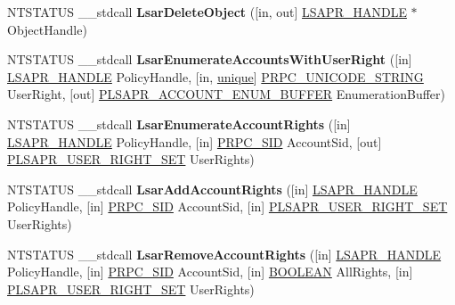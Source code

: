 \begin{DoxyCompactItemize}
\item 
\mbox{\label{interfacelsarpc_acb3a537af5e4ac85fac0cc5b1d6f45f1}} 
N\+T\+S\+T\+A\+T\+US \+\_\+\+\_\+stdcall {\bfseries Lsar\+Delete\+Object} (\mbox{[}in, out\mbox{]} \hyperlink{interfacevoid}{L\+S\+A\+P\+R\+\_\+\+H\+A\+N\+D\+LE} $\ast$Object\+Handle)
\item 
\mbox{\label{interfacelsarpc_a6236f080b841493ce6437fb4e32bf24b}} 
N\+T\+S\+T\+A\+T\+US \+\_\+\+\_\+stdcall {\bfseries Lsar\+Enumerate\+Accounts\+With\+User\+Right} (\mbox{[}in\mbox{]} \hyperlink{interfacevoid}{L\+S\+A\+P\+R\+\_\+\+H\+A\+N\+D\+LE} Policy\+Handle, \mbox{[}in, \hyperlink{interfaceunique}{unique}\mbox{]} \hyperlink{struct___r_p_c___u_n_i_c_o_d_e___s_t_r_i_n_g}{P\+R\+P\+C\+\_\+\+U\+N\+I\+C\+O\+D\+E\+\_\+\+S\+T\+R\+I\+NG} User\+Right, \mbox{[}out\mbox{]} \hyperlink{struct___l_s_a_p_r___a_c_c_o_u_n_t___e_n_u_m___b_u_f_f_e_r}{P\+L\+S\+A\+P\+R\+\_\+\+A\+C\+C\+O\+U\+N\+T\+\_\+\+E\+N\+U\+M\+\_\+\+B\+U\+F\+F\+ER} Enumeration\+Buffer)
\item 
\mbox{\label{interfacelsarpc_a3a4999700367dcc76fba365a9e5048f6}} 
N\+T\+S\+T\+A\+T\+US \+\_\+\+\_\+stdcall {\bfseries Lsar\+Enumerate\+Account\+Rights} (\mbox{[}in\mbox{]} \hyperlink{interfacevoid}{L\+S\+A\+P\+R\+\_\+\+H\+A\+N\+D\+LE} Policy\+Handle, \mbox{[}in\mbox{]} \hyperlink{struct___r_p_c___s_i_d}{P\+R\+P\+C\+\_\+\+S\+ID} Account\+Sid, \mbox{[}out\mbox{]} \hyperlink{struct___l_s_a_p_r___u_s_e_r___r_i_g_h_t___s_e_t}{P\+L\+S\+A\+P\+R\+\_\+\+U\+S\+E\+R\+\_\+\+R\+I\+G\+H\+T\+\_\+\+S\+ET} User\+Rights)
\item 
\mbox{\label{interfacelsarpc_ad2e256990e86a8070520f54efa965425}} 
N\+T\+S\+T\+A\+T\+US \+\_\+\+\_\+stdcall {\bfseries Lsar\+Add\+Account\+Rights} (\mbox{[}in\mbox{]} \hyperlink{interfacevoid}{L\+S\+A\+P\+R\+\_\+\+H\+A\+N\+D\+LE} Policy\+Handle, \mbox{[}in\mbox{]} \hyperlink{struct___r_p_c___s_i_d}{P\+R\+P\+C\+\_\+\+S\+ID} Account\+Sid, \mbox{[}in\mbox{]} \hyperlink{struct___l_s_a_p_r___u_s_e_r___r_i_g_h_t___s_e_t}{P\+L\+S\+A\+P\+R\+\_\+\+U\+S\+E\+R\+\_\+\+R\+I\+G\+H\+T\+\_\+\+S\+ET} User\+Rights)
\item 
\mbox{\label{interfacelsarpc_a65c6619f9e6d723fa1c635354e21e50d}} 
N\+T\+S\+T\+A\+T\+US \+\_\+\+\_\+stdcall {\bfseries Lsar\+Remove\+Account\+Rights} (\mbox{[}in\mbox{]} \hyperlink{interfacevoid}{L\+S\+A\+P\+R\+\_\+\+H\+A\+N\+D\+LE} Policy\+Handle, \mbox{[}in\mbox{]} \hyperlink{struct___r_p_c___s_i_d}{P\+R\+P\+C\+\_\+\+S\+ID} Account\+Sid, \mbox{[}in\mbox{]} \hyperlink{_processor_bind_8h_a112e3146cb38b6ee95e64d85842e380a}{B\+O\+O\+L\+E\+AN} All\+Rights, \mbox{[}in\mbox{]} \hyperlink{struct___l_s_a_p_r___u_s_e_r___r_i_g_h_t___s_e_t}{P\+L\+S\+A\+P\+R\+\_\+\+U\+S\+E\+R\+\_\+\+R\+I\+G\+H\+T\+\_\+\+S\+ET} User\+Rights)

\end{DoxyCompactItemize}
